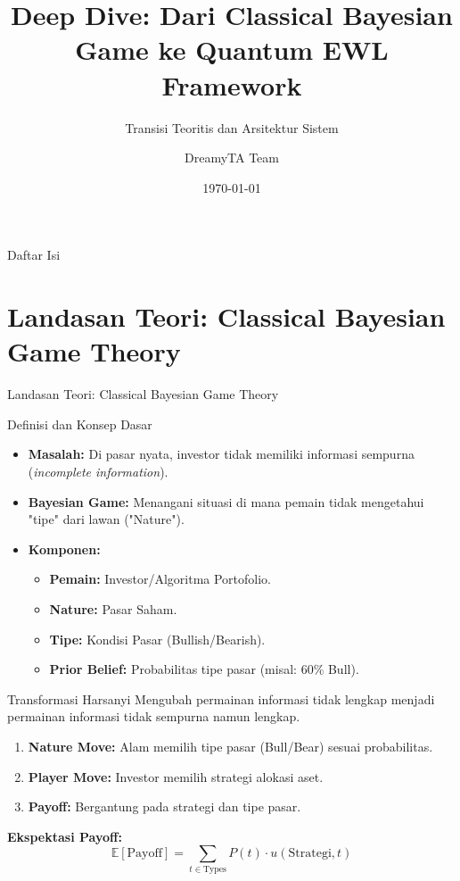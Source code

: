 \documentclass{beamer}
\title[Quantum Bayesian Game Framework]{Deep Dive: Dari Classical Bayesian Game ke Quantum EWL Framework}
\subtitle{Transisi Teoritis dan Arsitektur Sistem}
\author{DreamyTA Team}
\date{\today}
\begin{document}
\begin{frame}
    \titlepage
\end{frame}

\begin{frame}{Daftar Isi}
    \tableofcontents
\end{frame}



\section{Landasan Teori: Classical Bayesian Game Theory}

\begin{frame}{Landasan Teori: Classical Bayesian Game Theory}
    \begin{block}{Definisi dan Konsep Dasar}
        \begin{itemize}
            \item \textbf{Masalah:} Di pasar nyata, investor tidak memiliki informasi sempurna (\textit{incomplete information}).
            \item \textbf{Bayesian Game:} Menangani situasi di mana pemain tidak mengetahui "tipe" dari lawan ("Nature").
            \item \textbf{Komponen:}
            \begin{itemize}
                \item \textbf{Pemain:} Investor/Algoritma Portofolio.
                \item \textbf{Nature:} Pasar Saham.
                \item \textbf{Tipe:} Kondisi Pasar (Bullish/Bearish).
                \item \textbf{Prior Belief:} Probabilitas tipe pasar (misal: 60\% Bull).
            \end{itemize}
        \end{itemize}
    \end{block}
\end{frame}

\begin{frame}{Transformasi Harsanyi}
    Mengubah permainan informasi tidak lengkap menjadi permainan informasi tidak sempurna namun lengkap.
    
    \begin{enumerate}
        \item \textbf{Nature Move:} Alam memilih tipe pasar (Bull/Bear) sesuai probabilitas.
        \item \textbf{Player Move:} Investor memilih strategi alokasi aset.
        \item \textbf{Payoff:} Bergantung pada strategi dan tipe pasar.
    \end{enumerate}

    \vspace{0.5cm}
    \textbf{Ekspektasi Payoff:}
    $$ \mathbb{E}[\text{Payoff}] = \sum_{t \in \text{Types}} P(t) \cdot u(\text{Strategi}, t) $$
\end{frame}
\end{document}
